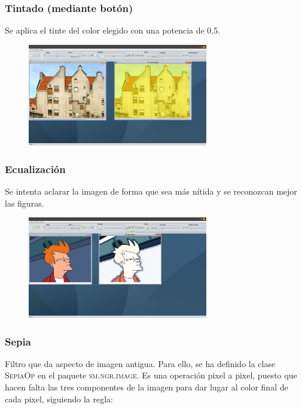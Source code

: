\documentclass[11pt,a4paper]{article}
\begin{document}
\subsubsection{Tintado (mediante botón)}
Se aplica el tinte del color elegido con una potencia de 0,5.

\begin{figure}[H]
\centering
	\includegraphics[width=0.7\textwidth]{img/tinte.png}
\end{figure}

\subsubsection{Ecualización}
Se intenta aclarar la imagen de forma que sea más nítida y se reconozcan mejor las figuras.

\begin{figure}[H]
\centering
	\includegraphics[width=0.7\textwidth]{img/ecual.png}
\end{figure}

\subsubsection{Sepia}
Filtro que da aspecto de imagen antigua. Para ello, se ha definido la clase \textsc{SepiaOp} en el paquete \textsc{sm.ngr.image}. Es una operación pixel a pixel, puesto que hacen falta las tres componentes de la imagen para dar lugar al color final de cada pixel, siguiendo la regla:\\
\end{document}
